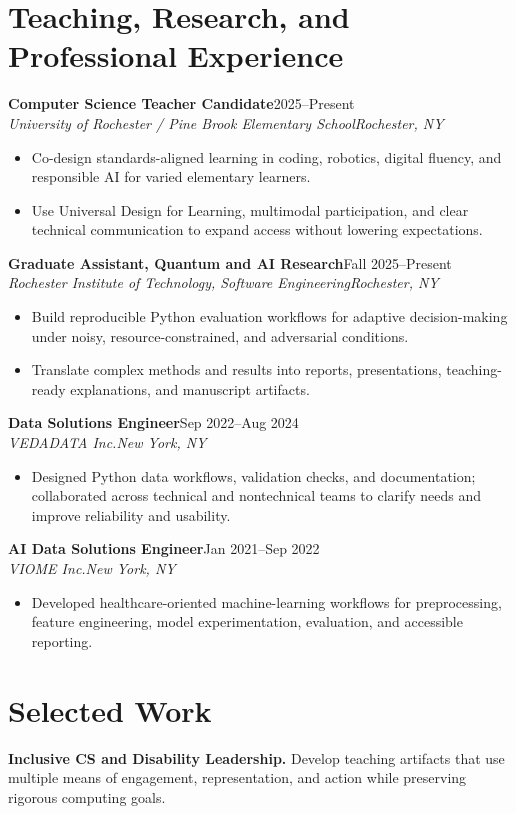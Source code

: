 \documentclass[10pt,letterpaper]{article}
\newcommand{\role}[4]{%
  \textbf{#1}\hfill #2\\
  \textit{#3}\hfill \textit{#4}\vspace{-3pt}
}
\begin{document}
\section*{Teaching, Research, and Professional Experience}
\role{Computer Science Teacher Candidate}{2025--Present}
{University of Rochester / Pine Brook Elementary School}{Rochester, NY}
\begin{itemize}
  \item Co-design standards-aligned learning in coding, robotics, digital
    fluency, and responsible AI for varied elementary learners.
  \item Use Universal Design for Learning, multimodal participation, and clear
    technical communication to expand access without lowering expectations.
\end{itemize}

\role{Graduate Assistant, Quantum and AI Research}{Fall 2025--Present}
{Rochester Institute of Technology, Software Engineering}{Rochester, NY}
\begin{itemize}
  \item Build reproducible Python evaluation workflows for adaptive
    decision-making under noisy, resource-constrained, and adversarial
    conditions.
  \item Translate complex methods and results into reports, presentations,
    teaching-ready explanations, and manuscript artifacts.
\end{itemize}

\role{Data Solutions Engineer}{Sep 2022--Aug 2024}
{VEDADATA Inc.}{New York, NY}
\begin{itemize}
  \item Designed Python data workflows, validation checks, and documentation;
    collaborated across technical and nontechnical teams to clarify needs and
    improve reliability and usability.
\end{itemize}

\role{AI Data Solutions Engineer}{Jan 2021--Sep 2022}
{VIOME Inc.}{New York, NY}
\begin{itemize}
  \item Developed healthcare-oriented machine-learning workflows for
    preprocessing, feature engineering, model experimentation, evaluation, and
    accessible reporting.
\end{itemize}

\section*{Selected Work}
\textbf{Inclusive CS and Disability Leadership.}
Develop teaching artifacts that use multiple means of engagement,
representation, and action while preserving rigorous computing goals.
\end{document}
